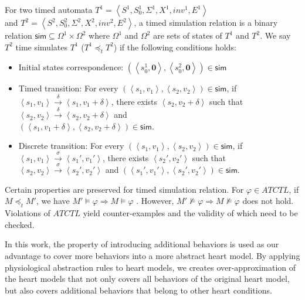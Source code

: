 For two timed automata $T^1=\left\langle S^1,S_0^1,\Sigma^1,X^1,inv^1,E^1\right\rangle$ \\and $T^2=\left\langle S^2,S_0^2,\Sigma^2,X^2,inv^2,E^2\right\rangle$, a timed simulation relation is a binary relation $\textsf{sim}\subseteq \Omega^1\times \Omega^2$ where $\Omega^1$ and $\Omega^2$ are sets of states of $T^1$ and $T^2$. We say $T^2$ \textsf{time simulates} $T^1$ ($T^1 \preceq_t T^2$) if the following conditions holds:
\begin{itemize}
	\item Initial states correspondence: $(\left\langle s_0^1,\textbf{0}\right\rangle,\left\langle s_0^2,\textbf{0}\right\rangle)\in \textsf{sim}$
	\item Timed transition: For every $(\left\langle s_1,v_1\right\rangle,\left\langle s_2,v_2\right\rangle)\in\textsf{sim}$, if $\left\langle s_1,v_1\right\rangle\xrightarrow{\delta}\left\langle s_1,v_1+\delta\right\rangle$, there exists $\left\langle s_2,v_2+\delta\right\rangle$ such that $\left\langle s_2,v_2\right\rangle\xrightarrow{\delta}\left\langle s_2,v_2+\delta\right\rangle$ and \\$(\left\langle s_1,v_1+\delta\right\rangle,\left\langle s_2,v_2+\delta\right\rangle)\in\textsf{sim}$.
	\item Discrete transition: For every $(\left\langle s_1,v_1\right\rangle,\left\langle s_2,v_2\right\rangle)\in\textsf{sim}$, if $\left\langle s_1,v_1\right\rangle\xrightarrow{\sigma}\left\langle s_1',v_1'\right\rangle$, there exists $\left\langle s_2',v_2'\right\rangle$ such that $\left\langle s_2,v_2\right\rangle\xrightarrow{\sigma}\left\langle s_2',v_2'\right\rangle$ and $(\left\langle s_1',v_1'\right\rangle,\left\langle s_2',v_2'\right\rangle)\in\textsf{sim}$.
\end{itemize}

Certain properties are preserved for timed simulation relation. 
For $\varphi\in ATCTL$, if $M\preceq_t M'$, we have $M'\models \varphi\Rightarrow M\models\varphi$ \cite{simulation}. 
However, $M'\not\models \varphi\Rightarrow M\not\models\varphi$ does not hold. 
Violations of $ATCTL$ yield \textsf{counter-examples} and the validity of which need to be checked.

In this work, the property of introducing additional behaviors is used as our advantage to cover more behaviors into a more abstract heart model.
By applying physiological abstraction rules to heart models, we creates over-approximation of the heart models that not only covers all behaviors of the original heart model, but also covers additional behaviors that belong to other heart conditions.

